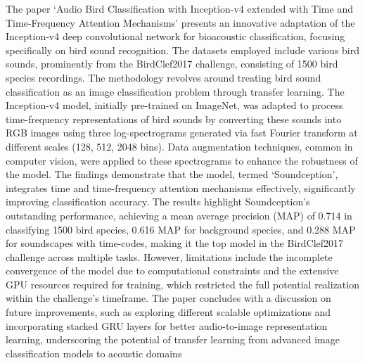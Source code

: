 The paper `Audio Bird Classification with Inception-v4 extended with Time and Time-Frequency Attention Mechanisms' presents an innovative adaptation of the Inception-v4 deep convolutional network for bioacoustic classification, focusing specifically on bird sound recognition. The datasets employed include various bird sounds, prominently from the BirdClef2017 challenge, consisting of 1500 bird species recordings. The methodology revolves around treating bird sound classification as an image classification problem through transfer learning. The Inception-v4 model, initially pre-trained on ImageNet, was adapted to process time-frequency representations of bird sounds by converting these sounds into RGB images using three log-spectrograms generated via fast Fourier transform at different scales (128, 512, 2048 bins). Data augmentation techniques, common in computer vision, were applied to these spectrograms to enhance the robustness of the model. The findings demonstrate that the model, termed `Soundception', integrates time and time-frequency attention mechanisms effectively, significantly improving classification accuracy. The results highlight Soundception's outstanding performance, achieving a mean average precision (MAP) of 0.714 in classifying 1500 bird species, 0.616 MAP for background species, and 0.288 MAP for soundscapes with time-codes, making it the top model in the BirdClef2017 challenge across multiple tasks. However, limitations include the incomplete convergence of the model due to computational constraints and the extensive GPU resources required for training, which restricted the full potential realization within the challenge's timeframe. The paper concludes with a discussion on future improvements, such as exploring different scalable optimizations and incorporating stacked GRU layers for better audio-to-image representation learning, underscoring the potential of transfer learning from advanced image classification models to acoustic domains\\

